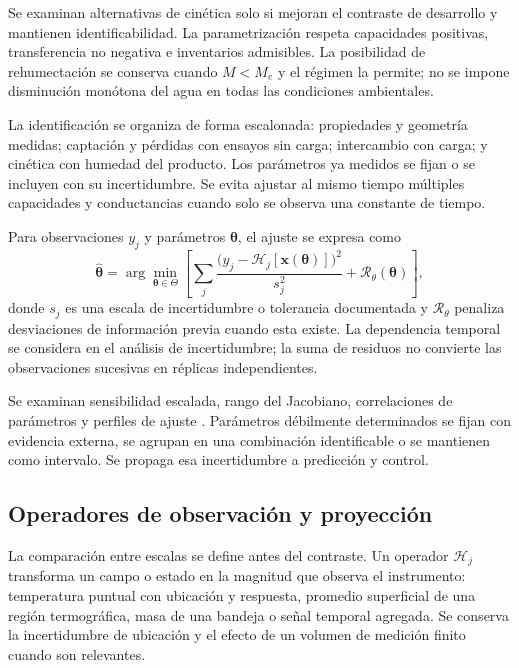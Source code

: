 Se examinan alternativas de cinética solo si mejoran el contraste de desarrollo y mantienen identificabilidad. La parametrización respeta capacidades positivas, transferencia no negativa e inventarios admisibles. La posibilidad de rehumectación se conserva cuando $M<M_e$ y el régimen la permite; no se impone disminución monótona del agua en todas las condiciones ambientales.

La identificación se organiza de forma escalonada: propiedades y geometría medidas; captación y pérdidas con ensayos sin carga; intercambio con carga; y cinética con humedad del producto. Los parámetros ya medidos se fijan o se incluyen con su incertidumbre. Se evita ajustar al mismo tiempo múltiples capacidades y conductancias cuando solo se observa una constante de tiempo.

Para observaciones $y_j$ y parámetros $\boldsymbol\theta$, el ajuste se expresa como
\begin{equation}
\widehat{\boldsymbol\theta}
=\arg\min_{\boldsymbol\theta\in\Theta}
\left[
\sum_j
\frac{\bigl(y_j-\mathcal H_j[\mathbf x(\boldsymbol\theta)]\bigr)^2}
{s_j^2}
+\mathcal R_\theta(\boldsymbol\theta)
\right],
\label{met:ajuste_fisico}
\end{equation}
donde $s_j$ es una escala de incertidumbre o tolerancia documentada y $\mathcal R_\theta$ penaliza desviaciones de información previa cuando esta existe. La dependencia temporal se considera en el análisis de incertidumbre; la suma de residuos no convierte las observaciones sucesivas en réplicas independientes.

Se examinan sensibilidad escalada, rango del Jacobiano, correlaciones de parámetros y perfiles de ajuste \cite{ljung1999}. Parámetros débilmente determinados se fijan con evidencia externa, se agrupan en una combinación identificable o se mantienen como intervalo. Se propaga esa incertidumbre a predicción y control.

\subsection{Operadores de observación y proyección}
\label{met:operadores}

La comparación entre escalas se define antes del contraste. Un operador $\mathcal H_j$ transforma un campo o estado en la magnitud que observa el instrumento: temperatura puntual con ubicación y respuesta, promedio superficial de una región termográfica, masa de una bandeja o señal temporal agregada. Se conserva la incertidumbre de ubicación y el efecto de un volumen de medición finito cuando son relevantes.

